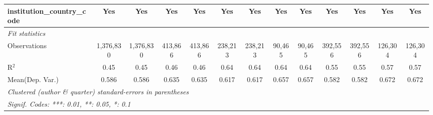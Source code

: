 \begin{tabular}{lcccccccccccc}
   institution\_country\_code               & Yes           & Yes           & Yes           & Yes            & Yes           & Yes            & Yes           & Yes           & Yes           & Yes           & Yes           & Yes\\  
   \midrule
   \emph{Fit statistics}\\
   Observations                             & 1,376,830     & 1,376,830     & 413,866       & 413,866        & 238,213       & 238,213        & 90,465        & 90,465        & 392,556       & 392,556       & 126,304       & 126,304\\  
   R$^2$                                    & 0.45          & 0.45          & 0.46          & 0.46           & 0.64          & 0.64           & 0.64          & 0.64          & 0.55          & 0.55          & 0.57          & 0.57\\  
Mean(Dep. Var.) & 0.586 & 0.586 & 0.635 & 0.635 & 0.617 & 0.617 & 0.657 & 0.657 & 0.582 & 0.582 & 0.672 & 0.672 \\
   \midrule \midrule
   \multicolumn{13}{l}{\emph{Clustered (author \& quarter) standard-errors in parentheses}}\\
   \multicolumn{13}{l}{\emph{Signif. Codes: ***: 0.01, **: 0.05, *: 0.1}}\\
\end{tabular}
\par\endgroup
